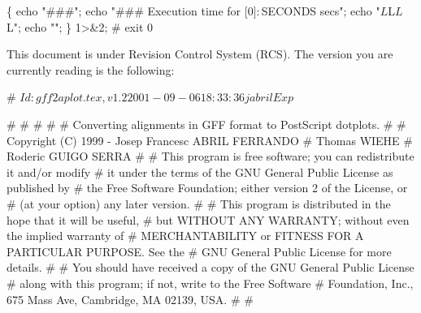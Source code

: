 \documentclass[11pt]{article}
\def\nwendcode{\endtrivlist \endgroup} %
\let\nwdocspar=\par                    %
\begin{document}
\nwenddocs{}\endmoddef
\{ echo "###"; echo "### Execution time for [$0] : $SECONDS secs";
  echo "$L$L$L$L";
  echo ""; \} 1>&2;
#
exit 0
\nwendcode{}\nwdocspar


This document is under Revision Control System (RCS). The version you are currently reading is the following:

\nwenddocs{}\endmoddef
# $Id: gff2aplot.tex,v 1.2 2001-09-06 18:33:36 jabril Exp $
\nwendcode{}\nwdocspar


\nwenddocs{}\endmoddef
# %
# %
# %
# 
#    Converting alignments in GFF format to PostScript dotplots.
# 
#     Copyright (C) 1999 - Josep Francesc ABRIL FERRANDO  
#                                  Thomas WIEHE                   
#                                 Roderic GUIGO SERRA       
#
# This program is free software; you can redistribute it and/or modify
# it under the terms of the GNU General Public License as published by
# the Free Software Foundation; either version 2 of the License, or
# (at your option) any later version.
# 
# This program is distributed in the hope that it will be useful,
# but WITHOUT ANY WARRANTY; without even the implied warranty of
# MERCHANTABILITY or FITNESS FOR A PARTICULAR PURPOSE.  See the
# GNU General Public License for more details.
# 
# You should have received a copy of the GNU General Public License
# along with this program; if not, write to the Free Software
# Foundation, Inc., 675 Mass Ave, Cambridge, MA 02139, USA.
# 
# %
\nwendcode{}\nwdocspar
\end{document}
